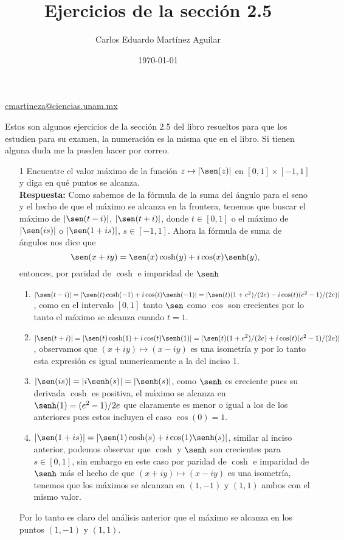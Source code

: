 \documentclass[letterpaper]{article}
\author{Carlos Eduardo Martínez Aguilar}
\date{\today}
\title{Ejercicios de la sección 2.5}
\begin{document}
\maketitle
\begin{center}
\href{mailto:cmartineza@ciencias.unam.mx}{cmartineza@ciencias.unam.mx}
\end{center}

\noindent Estos son algunos ejercicios de la sección 2.5 del libro resueltos para que los estudien para su examen, la numeración es la misma que en el libro. Si tienen alguna duda me la pueden hacer por correo.

\begin{itemize}
  \item[1] Encuentre el valor máximo de la función $z\mapsto|\sen(z)|$ en $[0,1]\times[-1,1]$ y diga en qué puntos se alcanza.\\
        \textbf{Respuesta:} Como sabemos de la fórmula de la suma del ángulo para el seno y el hecho de que el máximo se alcanza en la frontera, tenemos que buscar el máximo de $|\sen(t-i)|$, $|\sen(t+i)|$, donde $t\in[0,1]$ o el máximo de $|\sen(is)|$ o $|\sen(1+is)|$, $s\in[-1,1]$. Ahora la fórmula de suma de ángulos nos dice que
        \[
            \sen(x+iy)=\sen(x)\cosh(y)+i\cos(x)\senh(y),
        \]
        entonces, por paridad de $\cosh$ e imparidad de $\senh$
        \begin{enumerate}
          \item $|\sen(t-i)|=|\sen(t)\cosh(-1) + i\cos(t)\senh(-1)|=|\sen(t)(1 + e^2)/(2e)-i\cos(t)(e^{2}-1)/(2e)|$, como en el intervalo $[0,1]$ tanto $\sen$ como $\cos$ son crecientes por lo tanto el máximo se alcanza cuando $t=1$.
          \item $|\sen(t+i)|=|\sen(t)\cosh(1) + i\cos(t)\senh(1)|=|\sen(t)(1 + e^2)/(2e)+i\cos(t)(e^{2}-1)/(2e)|$, observamos que $(x+iy)\mapsto(x-iy)$ es una isometría y por lo tanto esta expresión es igual numericamente a la del inciso 1.
          \item $|\sen(is)|=|i\senh(s)|=|\senh(s)|$, como $\senh$ es creciente pues su derivada $\cosh$ es positiva, el máximo se alcanza en $\senh(1)=(e^{2}-1)/2e$ que claramente es menor o igual a los de los anteriores pues estos incluyen el caso $\cos(0)=1$.
          \item $|\sen(1+is)|=|\sen(1)\cosh(s)+i\cos(1)\senh(s)|$, similar al inciso anterior, podemos observar que $\cosh$ y $\senh$ son crecientes para $s\in [0,1]$, sin embargo en este caso por paridad de $\cosh$ e imparidad de $\senh$ más el hecho de que  $(x+iy)\mapsto(x-iy)$ es una isometría, tenemos que los máximos se alcanzan en $(1,-1)$ y $(1,1)$ ambos con el mismo valor.
        \end{enumerate}
        Por lo tanto es claro del análisis anterior que el máximo se alcanza en los puntos $(1,-1)$ y $(1,1)$.


\end{itemize}
\end{document}
